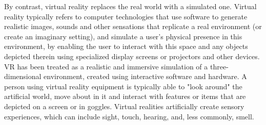 \documentclass[preprint,12pt]{elsarticle}
\begin{document}
By contrast, virtual reality replaces the real world with a simulated one\cite{chen2009if}. Virtual reality typically refers to computer technologies that use software to generate realistic images, sounds and other sensations that replicate a real environment (or create an imaginary setting), and simulate a user's physical presence in this environment, by enabling the user to interact with this space and any objects depicted therein using specialized display screens or projectors and other devices. VR has been treated as a realistic and immersive simulation of a three-dimensional environment, created using interactive software and hardware. A person using virtual reality equipment is typically able to "look around" the artificial world, move about in it and interact with features or items that are depicted on a screen or in goggles. Virtual realities artificially create sensory experiences, which can include sight, touch, hearing, and, less commonly, smell. %

\end{document}
